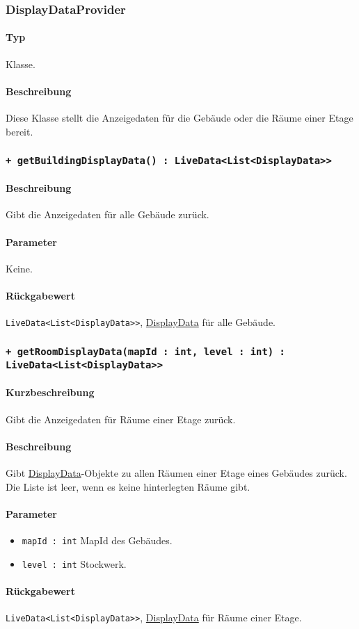\subsubsection{DisplayDataProvider}\label{App_Map_Model_DisplayDataProvider}
\paragraph*{Typ}
Klasse.
\paragraph*{Beschreibung}
Diese Klasse stellt die Anzeigedaten für die Gebäude oder die Räume einer Etage bereit.

\subsubsection*{\texttt{+ getBuildingDisplayData() : LiveData<List<DisplayData>>}}\label{App_Map_Model_getBuildingDisplayData_Display}%
\paragraph*{Beschreibung}
Gibt die Anzeigedaten für alle Gebäude zurück.
\paragraph*{Parameter}
Keine.
\paragraph*{Rückgabewert}
\texttt{LiveData<List<DisplayData>>}, \hyperref[App_Map_Util_DisplayData]{DisplayData} für alle Gebäude.

\subsubsection*{\texttt{+ getRoomDisplayData(mapId : int, level : int) : LiveData<List<DisplayData>>}}\label{App_Map_Model_getRoomDisplayData_Display}%
\paragraph*{Kurzbeschreibung}
Gibt die Anzeigedaten für Räume einer Etage zurück.
\paragraph*{Beschreibung}
Gibt \hyperref[App_Map_Util_DisplayData]{DisplayData}-Objekte zu allen Räumen einer Etage eines Gebäudes zurück.\\
Die Liste ist leer, wenn es keine hinterlegten Räume gibt.
\paragraph*{Parameter}
\begin{itemize}
    \item \texttt{mapId : int} MapId des Gebäudes.
    \item \texttt{level : int} Stockwerk.
\end{itemize}
\paragraph*{Rückgabewert}
\texttt{LiveData<List<DisplayData>>}, \hyperref[App_Map_Util_DisplayData]{DisplayData} für Räume einer Etage.